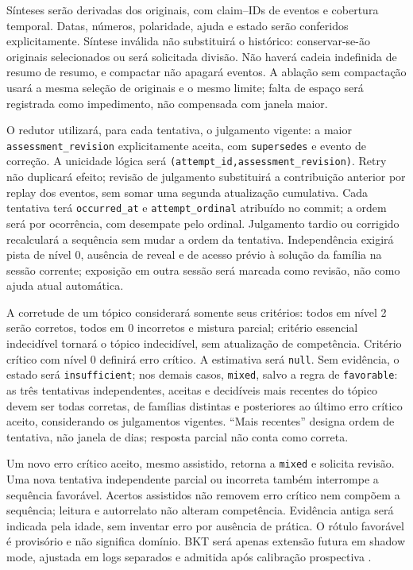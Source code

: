 \documentclass[12pt]{article}
\let\cite\citep
\newcommand{\code}[1]{\nolinkurl{#1}}
\begin{document}
Sínteses serão derivadas dos originais, com claim--IDs de eventos e cobertura temporal. Datas, números, polaridade, ajuda e estado serão conferidos explicitamente. Síntese inválida não substituirá o histórico: conservar-se-ão originais selecionados ou será solicitada divisão. Não haverá cadeia indefinida de resumo de resumo, e compactar não apagará eventos. A ablação sem compactação usará a mesma seleção de originais e o mesmo limite; falta de espaço será registrada como impedimento, não compensada com janela maior.

O redutor utilizará, para cada tentativa, o julgamento vigente: a maior \code{assessment_revision} explicitamente aceita, com \code{supersedes} e evento de correção. A unicidade lógica será \code{(attempt_id,assessment_revision)}. Retry não duplicará efeito; revisão de julgamento substituirá a contribuição anterior por replay dos eventos, sem somar uma segunda atualização cumulativa. Cada tentativa terá \code{occurred_at} e \code{attempt_ordinal} atribuído no commit; a ordem será por ocorrência, com desempate pelo ordinal. Julgamento tardio ou corrigido recalculará a sequência sem mudar a ordem da tentativa. Independência exigirá pista de nível 0, ausência de reveal e de acesso prévio à solução da família na sessão corrente; exposição em outra sessão será marcada como revisão, não como ajuda atual automática.

A corretude de um tópico considerará somente seus critérios: todos em nível 2 serão corretos, todos em 0 incorretos e mistura parcial; critério essencial indecidível tornará o tópico indecidível, sem atualização de competência. Critério crítico com nível 0 definirá erro crítico. A estimativa será \code{null}. Sem evidência, o estado será \code{insufficient}; nos demais casos, \code{mixed}, salvo a regra de \code{favorable}: as três tentativas independentes, aceitas e decidíveis mais recentes do tópico devem ser todas corretas, de famílias distintas e posteriores ao último erro crítico aceito, considerando os julgamentos vigentes. ``Mais recentes'' designa ordem de tentativa, não janela de dias; resposta parcial não conta como correta.

Um novo erro crítico aceito, mesmo assistido, retorna a \code{mixed} e solicita revisão. Uma nova tentativa independente parcial ou incorreta também interrompe a sequência favorável. Acertos assistidos não removem erro crítico nem compõem a sequência; leitura e autorrelato não alteram competência. Evidência antiga será indicada pela idade, sem inventar erro por ausência de prática. O rótulo favorável é provisório e não significa domínio. BKT será apenas extensão futura em shadow mode, ajustada em logs separados e admitida após calibração prospectiva \cite{badrinath2021pybkt}.
\end{document}
